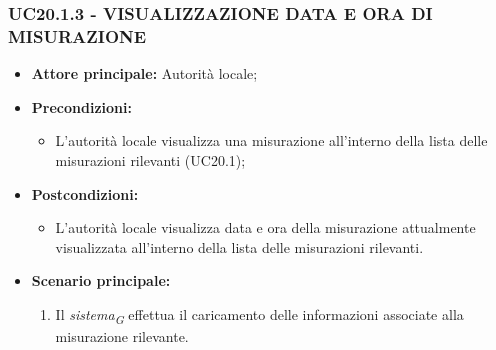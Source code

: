 \subsubsection{UC20.1.3 - VISUALIZZAZIONE DATA E ORA DI MISURAZIONE}
\begin{itemize}
    \item \textbf{Attore principale:} Autorità locale;
    \item \textbf{Precondizioni:}
        \begin{itemize}
                \item L'autorità locale visualizza una misurazione all'interno della lista delle misurazioni rilevanti (UC20.1);
        \end{itemize}
    \vspace{0,5cm}
    \item \textbf{Postcondizioni:}
        \begin{itemize}
            \item L'autorità locale visualizza data e ora della misurazione attualmente visualizzata all'interno della lista delle misurazioni rilevanti.
        \end{itemize}
    \item \textbf{Scenario principale:}
        \begin{enumerate}
            \item Il \textit{sistema}\textsubscript{\textit{G}} effettua il caricamento delle informazioni associate alla misurazione rilevante.
        \end{enumerate}
\end{itemize}